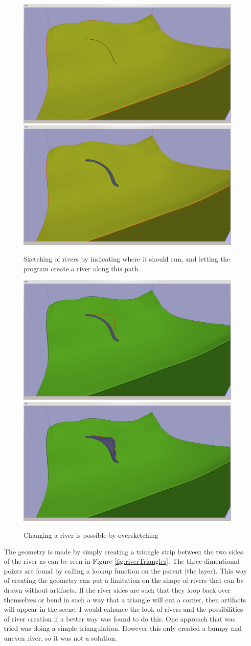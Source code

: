 \documentclass[a4paper,12pt]{report}
\begin{document}
\begin{figure}
\includegraphics[trim = 30mm 80mm 120mm 30mm, clip,width=.5\linewidth]{thesis/results/riverDraw.png}
\includegraphics[trim = 30mm 80mm 120mm 30mm, clip,width=.5\linewidth]{thesis/results/riverDrawn.png}
 \caption{Sketching of rivers by indicating where it should run, and letting the program create a river along this path. }
 \label{fig:riverDraw}
\end{figure}

\begin{figure}
\includegraphics[trim = 30mm 80mm 120mm 30mm, clip,width=.5\linewidth]{thesis/results/riverChange.png}
\includegraphics[trim = 30mm 80mm 120mm 30mm, clip,width=.5\linewidth]{thesis/results/riverChanged.png}
 \caption{Changing a river is possible by oversketching }
 \label{fig:riverChange}
\end{figure}


The geometry is made by simply creating a triangle strip between the two sides of the river as can be seen in Figure \ref{fig:riverTriangles}. The three dimentional points are found by calling a lookup function on the parent (the layer). This way of creating the geometry can put a limitation on the shape of rivers that can be drawn without artifacts. If the river sides are such that they loop back over themselves or bend in such a way that a triangle will cut a corner, then artifacts will appear in the scene. I would enhance the look of rivers and the possibilities of river creation if a better way was found to do this. One approach that was tried was doing a simple triangulation. However this only created a bumpy and uneven river, so it was not a solution.
\end{document}
